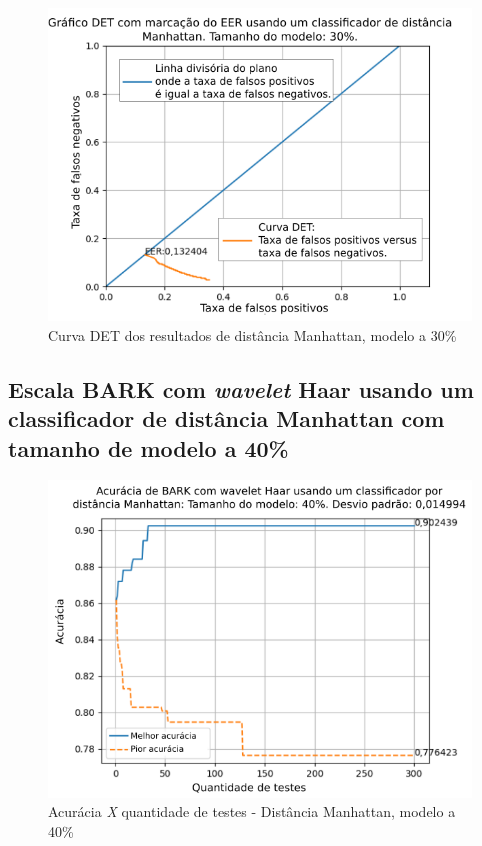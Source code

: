 \begin{figure}[!ht]
	\centering
	\includegraphics[width=\linewidth]{images/results/det/DET_for_classifier_Manhattan_30}
	\caption{Curva DET dos resultados de distância Manhattan, modelo a 30\%}
	\label{fig:detforclassifiermanhattan30}
\end{figure}

\subsection{Escala BARK com \textit{wavelet} Haar usando um classificador de distância Manhattan com tamanho de modelo a 40\%}



\begin{figure}[!ht]
	\centering
	\includegraphics[width=\linewidth]{images/results/confusionMatrices/classifier_Manhattan_40.png}
	\caption{Acurácia \textit{X} quantidade de testes - Distância Manhattan, modelo a 40\%}
	\label{fig:classifiermanhattan40}
\end{figure}

